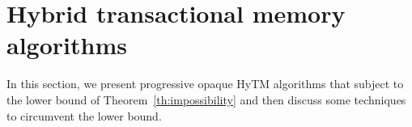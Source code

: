 \section{Hybrid transactional memory algorithms}\label{sec:hytmalgos}
%
%
In this section, we present progressive opaque HyTM algorithms that subject to the lower bound
of Theorem~\ref{th:impossibility} and then discuss some techniques to circumvent the lower bound.
%

%
%